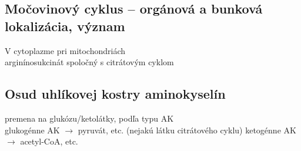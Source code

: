 \subsection{Močovinový cyklus -- orgánová a bunková lokalizácia, význam}
V cytoplazme pri mitochondriách\\
arginínosukcinát spoločný s citrátovým cyklom\\
\subsection{Osud uhlíkovej kostry aminokyselín}
premena na glukózu/ketolátky, podľa typu AK\\
glukogénne AK $\rightarrow$ pyruvát, etc. (nejakú látku citrátového cyklu)
ketogénne AK $\rightarrow$ acetyl-CoA, etc.
